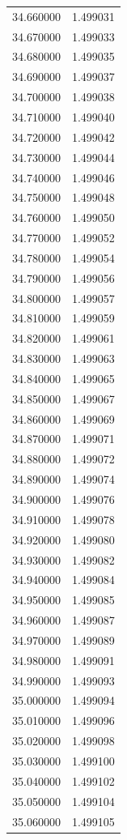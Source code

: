 \begin{tabular}{rr}
34.660000 & 1.499031 \\
34.670000 & 1.499033 \\
34.680000 & 1.499035 \\
34.690000 & 1.499037 \\
34.700000 & 1.499038 \\
34.710000 & 1.499040 \\
34.720000 & 1.499042 \\
34.730000 & 1.499044 \\
34.740000 & 1.499046 \\
34.750000 & 1.499048 \\
34.760000 & 1.499050 \\
34.770000 & 1.499052 \\
34.780000 & 1.499054 \\
34.790000 & 1.499056 \\
34.800000 & 1.499057 \\
34.810000 & 1.499059 \\
34.820000 & 1.499061 \\
34.830000 & 1.499063 \\
34.840000 & 1.499065 \\
34.850000 & 1.499067 \\
34.860000 & 1.499069 \\
34.870000 & 1.499071 \\
34.880000 & 1.499072 \\
34.890000 & 1.499074 \\
34.900000 & 1.499076 \\
34.910000 & 1.499078 \\
34.920000 & 1.499080 \\
34.930000 & 1.499082 \\
34.940000 & 1.499084 \\
34.950000 & 1.499085 \\
34.960000 & 1.499087 \\
34.970000 & 1.499089 \\
34.980000 & 1.499091 \\
34.990000 & 1.499093 \\
35.000000 & 1.499094 \\
35.010000 & 1.499096 \\
35.020000 & 1.499098 \\
35.030000 & 1.499100 \\
35.040000 & 1.499102 \\
35.050000 & 1.499104 \\
35.060000 & 1.499105 \\

\end{tabular}
